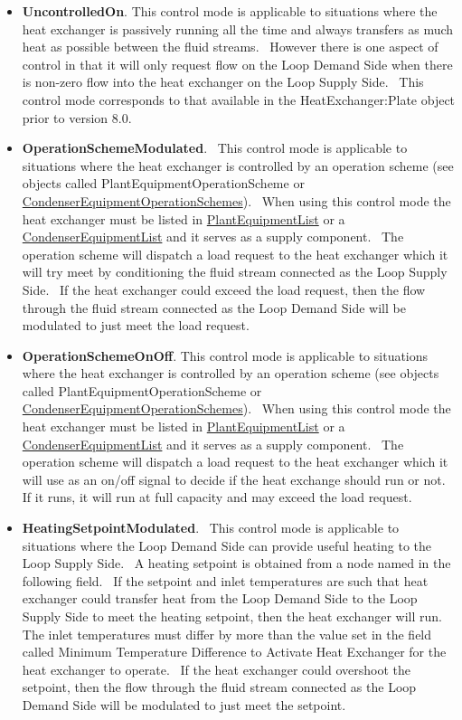 \begin{itemize}
\item
  \textbf{UncontrolledOn}. This control mode is applicable to situations where the heat exchanger is passively running all the time and always transfers as much heat as possible between the fluid streams.~ However there is one aspect of control in that it will only request flow on the Loop Demand Side when there is non-zero flow into the heat exchanger on the Loop Supply Side.~ This control mode corresponds to that available in the HeatExchanger:Plate object prior to version 8.0.
\item
  \textbf{OperationSchemeModulated}.~ This control mode is applicable to situations where the heat exchanger is controlled by an operation scheme (see objects called PlantEquipmentOperationScheme or \hyperref[condenserequipmentoperationschemes]{CondenserEquipmentOperationSchemes}).~ When using this control mode the heat exchanger must be listed in \hyperref[plantequipmentlist]{PlantEquipmentList} or a \hyperref[condenserequipmentlist]{CondenserEquipmentList} and it serves as a supply component.~ The operation scheme will dispatch a load request to the heat exchanger which it will try meet by conditioning the fluid stream connected as the Loop Supply Side.~ If the heat exchanger could exceed the load request, then the flow through the fluid stream connected as the Loop Demand Side will be modulated to just meet the load request.
\item
  \textbf{OperationSchemeOnOff}. This control mode is applicable to situations where the heat exchanger is controlled by an operation scheme (see objects called PlantEquipmentOperationScheme or \hyperref[condenserequipmentoperationschemes]{CondenserEquipmentOperationSchemes}).~ When using this control mode the heat exchanger must be listed in \hyperref[plantequipmentlist]{PlantEquipmentList} or a \hyperref[condenserequipmentlist]{CondenserEquipmentList} and it serves as a supply component.~ The operation scheme will dispatch a load request to the heat exchanger which it will use as an on/off signal to decide if the heat exchange should run or not.~ If it runs, it will run at full capacity and may exceed the load request.
\item
  \textbf{HeatingSetpointModulated}.~ This control mode is applicable to situations where the Loop Demand Side can provide useful heating to the Loop Supply Side.~ A heating setpoint is obtained from a node named in the following field.~ If the setpoint and inlet temperatures are such that heat exchanger could transfer heat from the Loop Demand Side to the Loop Supply Side to meet the heating setpoint, then the heat exchanger will run.~ The inlet temperatures must differ by more than the value set in the field called Minimum Temperature Difference to Activate Heat Exchanger for the heat exchanger to operate. ~If the heat exchanger could overshoot the setpoint, then the flow through the fluid stream connected as the Loop Demand Side will be modulated to just meet the setpoint.

\end{itemize}
